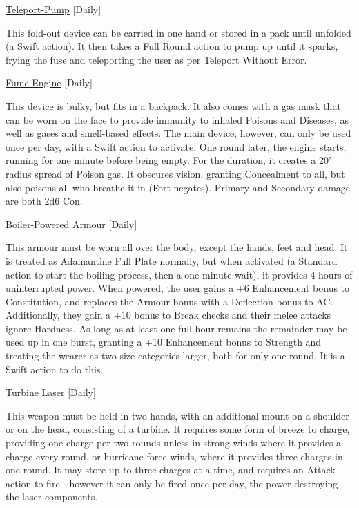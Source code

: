 \medskip\noindent\underline{Teleport-Pump} [Daily]

\noindent This fold-out device can be carried in one hand or stored in a pack until unfolded (a Swift action). It then takes a Full Round action to pump up until it sparks, frying the fuse and teleporting the user as per Teleport Without Error.

\medskip\noindent\underline{Fume Engine} [Daily]

\noindent This device is bulky, but fits in a backpack. It also comes with a gas mask that can be worn on the face to provide immunity to inhaled Poisons and Diseases, as well as gases and smell-based effects. The main device, however, can only be used once per day, with a Swift action to activate. One round later, the engine starts, running for one minute before being empty. For the duration, it creates a 20' radius spread of Poison gas. It obscures vision, granting Concealment to all, but also poisons all who breathe it in (Fort negates). Primary and Secondary damage are both 2d6 Con.

\medskip\noindent\underline{Boiler-Powered Armour} [Daily]

\noindent This armour must be worn all over the body, except the hands, feet and head. It is treated as Adamantine Full Plate normally, but when activated (a Standard action to start the boiling process, then a one minute wait), it provides 4 hours of uninterrupted power. When powered, the user gains a +6 Enhancement bonus to Constitution, and replaces the Armour bonus with a Deflection bonus to AC. Additionally, they gain a +10 bonus to Break checks and their melee attacks ignore Hardness. As long as at least one full hour remains the remainder may be used up in one burst, granting a +10 Enhancement bonus to Strength and treating the wearer as two size categories larger, both for only one round. It is a Swift action to do this.

\medskip\noindent\underline{Turbine Laser} [Daily]

\noindent This weapon must be held in two hands, with an additional mount on a shoulder or on the head, consisting of a turbine. It requires some form of breeze to charge, providing one charge per two rounds unless in strong winds where it provides a charge every round, or hurricane force winds, where it provides three charges in one round. It may store up to three charges at a time, and requires an Attack action to fire - however it can only be fired once per day, the power destroying the laser components.


